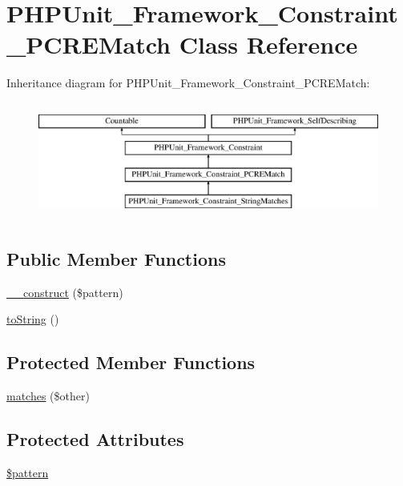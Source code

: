 \hypertarget{class_p_h_p_unit___framework___constraint___p_c_r_e_match}{}\section{P\+H\+P\+Unit\+\_\+\+Framework\+\_\+\+Constraint\+\_\+\+P\+C\+R\+E\+Match Class Reference}
\label{class_p_h_p_unit___framework___constraint___p_c_r_e_match}
Inheritance diagram for P\+H\+P\+Unit\+\_\+\+Framework\+\_\+\+Constraint\+\_\+\+P\+C\+R\+E\+Match\+:\begin{figure}[H]
\begin{center}
\leavevmode
\includegraphics[height=3.888889cm]{class_p_h_p_unit___framework___constraint___p_c_r_e_match}
\end{center}
\end{figure}
\subsection*{Public Member Functions}
\begin{DoxyCompactItemize}
\item 
\mbox{\hyperlink{class_p_h_p_unit___framework___constraint___p_c_r_e_match_a9ac17c8be194e5684d9ba33bb1773942}{\+\_\+\+\_\+construct}} (\$pattern)
\item 
\mbox{\hyperlink{class_p_h_p_unit___framework___constraint___p_c_r_e_match_a5558c5d549f41597377fa1ea8a1cefa3}{to\+String}} ()
\end{DoxyCompactItemize}
\subsection*{Protected Member Functions}
\begin{DoxyCompactItemize}
\item 
\mbox{\hyperlink{class_p_h_p_unit___framework___constraint___p_c_r_e_match_a9c9c337de483bbdbb9fa249a6c7c9cc5}{matches}} (\$other)
\end{DoxyCompactItemize}
\subsection*{Protected Attributes}
\begin{DoxyCompactItemize}
\item 
\mbox{\hyperlink{class_p_h_p_unit___framework___constraint___p_c_r_e_match_af6fbb70c99c1f5a92778615a2a9861e6}{\$pattern}}
\end{DoxyCompactItemize}


